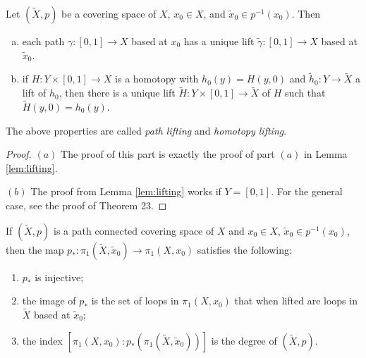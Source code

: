 \begin{lemma}\label{lem:general-lift}
  Let $(\widetilde{X}, p)$ be a covering space of
  $X$, $x_0 \in X$, and $\widetilde{x}_0 \in p^{-1}(x_0)$.
  Then
  \begin{enumerate}[(a)]
    \item each path $\gamma : [0, 1] \to X$ based
      at $x_0$ has a unique lift $\widetilde{\gamma} : [0, 1] \to X$
      based at $\widetilde{x}_0$.
    \item if $H : Y \times [0, 1] \to X$ is a homotopy
      with $h_0(y) = H(y, 0)$ and
      $\widetilde{h}_0 : Y \to \widetilde{X}$ a lift of
      $h_0$, then there is a unique lift
      $\widetilde{H} : Y \times [0, 1] \to \widetilde{X}$
      of $H$ such that $\widetilde{H}(y, 0) = h_0(y)$.
  \end{enumerate}
  The above properties are called \emph{path lifting}
  and \emph{homotopy lifting}.
\end{lemma}

\begin{proof}
  $(a)$ The proof of this part is exactly the proof of
  part $(a)$ in Lemma \ref{lem:lifting}.

  $(b)$ The proof from Lemma \ref{lem:lifting} works
  if $Y = [0, 1]$. For the general case, see the proof
  of Theorem 23.
\end{proof}

\begin{lemma}
  If $(\widetilde{X}, p)$ is a path connected
  covering space of $X$ and $x_0 \in X$,
  $\widetilde{x}_0 \in p^{-1}(x_0)$, then the map
  $p_* : \pi_1(\widetilde{X}, \widetilde{x}_0) \to
  \pi_1(X, x_0)$ satisfies the following:
  \begin{enumerate}
    \item $p_*$ is injective;
    \item the image of $p_*$ is the set of loops
      in $\pi_1(X, x_0)$ that when lifted are
      loops in $\widetilde{X}$ based at $\widetilde{x}_0$;
    \item the index $[\pi_1(X, x_0) : p_*(\pi_1(\widetilde{X}, \widetilde{x}_0))]$ is the degree of $(\widetilde{X}, p)$.
  \end{enumerate}
\end{lemma}

